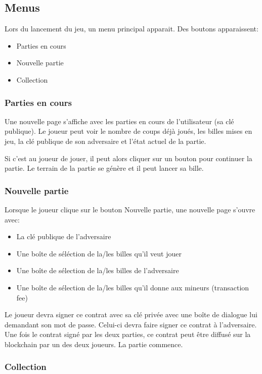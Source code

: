 \documentclass{article}
\begin{document}
\subsection{Menus}

Lors du lancement du jeu, un menu principal apparait. Des boutons apparaissent:
\begin{itemize}
    \item Parties en cours
    \item Nouvelle partie
    \item Collection
\end{itemize}

\subsubsection{Parties en cours}
Une nouvelle page s'affiche avec les parties en cours de l'utilisateur (sa clé publique). Le joueur peut voir le nombre de coups déjà joués, les billes mises en jeu, la clé publique de son adversaire et l'état actuel de la partie.

Si c'est au joueur de jouer, il peut alors cliquer sur un bouton pour continuer la partie. Le terrain de la partie se génère et il peut lancer sa bille.

\subsubsection{Nouvelle partie}
Lorsque le joueur clique sur le bouton Nouvelle partie, une nouvelle page s'ouvre avec:
\begin{itemize}
    \item La clé publique de l'adversaire
    \item Une boîte de séléction de la/les billes qu'il veut jouer
    \item Une boîte de sélection de la/les billes de l'adversaire
    \item Une boîte de sélection de la/les billes qu'il donne aux mineurs (transaction fee)
\end{itemize}

Le joueur devra signer ce contrat avec sa clé privée avec une boîte de dialogue lui demandant son mot de passe. Celui-ci devra faire signer ce contrat à l'adversaire. Une fois le contrat signé par les deux parties, ce contrat peut être diffusé sur la blockchain par un des deux joueurs. La partie commence.

\subsubsection{Collection}
\end{document}
